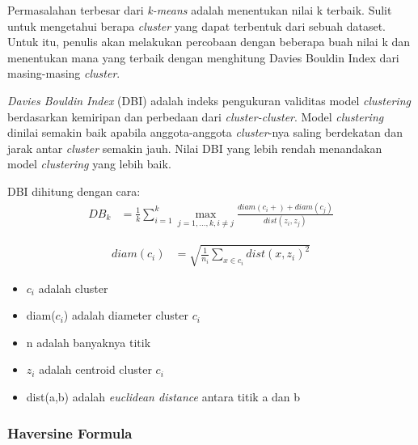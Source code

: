 \documentclass{article}
\begin{document}
\begin{adjustwidth}{4em}{0pt}

\hspace{\parindent}Permasalahan terbesar dari \textit{k-means} adalah menentukan nilai k terbaik. Sulit untuk mengetahui berapa \textit{cluster} yang dapat terbentuk dari sebuah dataset. Untuk itu, penulis akan melakukan percobaan dengan beberapa buah nilai k dan menentukan mana yang terbaik dengan menghitung Davies Bouldin Index dari masing-masing \textit{cluster}.

\textit{Davies Bouldin Index} (DBI) adalah indeks pengukuran validitas model \textit{clustering} berdasarkan kemiripan dan perbedaan dari \textit{cluster-cluster}. Model \textit{clustering} dinilai semakin baik apabila anggota-anggota \textit{cluster}-nya saling berdekatan dan jarak antar \textit{cluster} semakin jauh. Nilai DBI yang lebih rendah menandakan model \textit{clustering} yang lebih baik.

DBI dihitung dengan cara:
\begin{align*}
DB_{k} &= \frac{1}{k}\sum\limits_{i=1}^k
\max\limits_{j=1,...,k,i\neq j}\frac{diam(c_i +) + diam(c_j)}{dist(z_i,z_j)}
\end{align*}

\begin{align*}
diam(c_i) &= \sqrt{\frac{1}{n_i}\sum\limits_{x\in c_i}dist(x,z_i)^2}
\end{align*}

\begin{itemize}
	\setlength{\itemindent}{1cm}
	\item{$c_i$ adalah cluster}
	\item{diam($c_i$) adalah diameter cluster $c_i$}
	\item{n adalah banyaknya titik}
	\item{$z_i$ adalah centroid cluster $c_i$}
	\item{dist(a,b) adalah \textit{euclidean distance} antara titik a dan b}
\end{itemize}

\end{adjustwidth}

\subsubsection{Haversine Formula}
\end{document}
